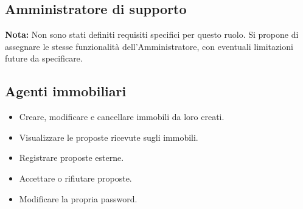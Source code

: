 \subsection*{Amministratore di supporto}
\textbf{Nota:} Non sono stati definiti requisiti specifici per questo ruolo. Si propone di assegnare le stesse funzionalità dell'Amministratore, con eventuali limitazioni future da specificare.

\subsection*{Agenti immobiliari}
\begin{itemize}
    \item Creare, modificare e cancellare immobili da loro creati.
    \item Visualizzare le proposte ricevute sugli immobili.
    \item Registrare proposte esterne.
    \item Accettare o rifiutare proposte.
    \item Modificare la propria password.
\end{itemize}




\clearpage





